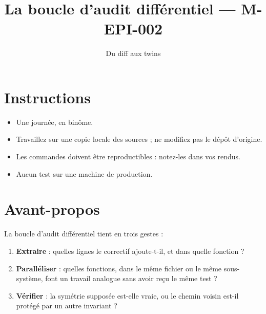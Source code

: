 \documentclass{training}
\begin{document}
\title{La boucle d'audit différentiel --- M-EPI-002}
\subtitle{Du diff aux twins}
\maketitle

\newpage
\tableofcontents
\newpage

\chapter{Instructions}
\begin{itemize}
  \item Une journée, en binôme.
  \item Travaillez sur une copie locale des sources ; ne modifiez pas le dépôt d'origine.
  \item Les commandes doivent être reproductibles : notez-les dans vos rendus.
  \item Aucun test sur une machine de production.
\end{itemize}





\chapter{Avant-propos}

La boucle d'audit différentiel tient en trois gestes :

\begin{enumerate}
  \item \textbf{Extraire} : quelles lignes le correctif ajoute-t-il, et dans
        quelle fonction ?
  \item \textbf{Paralléliser} : quelles fonctions, dans le même fichier ou
        le même sous-système, font un travail analogue sans avoir reçu le
        même test ?
  \item \textbf{Vérifier} : la symétrie supposée est-elle vraie, ou le
        chemin voisin est-il protégé par un autre invariant ?
\end{enumerate}
\end{document}
